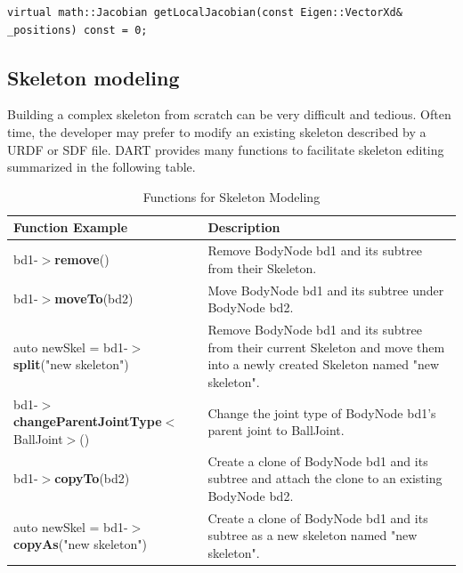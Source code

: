 \begin{lstlisting}[caption=Joint.h]
virtual math::Jacobian getLocalJacobian(const Eigen::VectorXd&
_positions) const = 0;
\end{lstlisting}






\subsection{Skeleton modeling}
Building a complex skeleton from scratch can be very
difficult and tedious. Often time, the developer may prefer to modify an
existing skeleton described by a URDF or SDF file. DART provides many
functions to facilitate skeleton editing summarized in the following
table.

\begin{table}[h]
\centering
\caption{Functions for Skeleton Modeling}
\begin{tabular}{|L{3.3in}|L{2.7in}|}
  \hline
  \textbf{Function Example} & \textbf{Description} \\
  \hline
  bd1-$>$\textbf{remove}() & Remove BodyNode bd1 and its subtree from their Skeleton.  \\
  \hline
   bd1-$>$\textbf{moveTo}(bd2) & Move BodyNode bd1 and its subtree under BodyNode bd2.  \\
  \hline
 auto newSkel = bd1-$>$\textbf{split}("new skeleton") & Remove BodyNode bd1 and its subtree from their current Skeleton and move them into a newly created Skeleton named "new skeleton".  \\
  \hline
 bd1-$>$\textbf{changeParentJointType}$<$BallJoint$>$() & Change the joint type of BodyNode bd1's parent joint to BallJoint.  \\
  \hline
bd1-$>$\textbf{copyTo}(bd2) & Create a clone of BodyNode bd1 and its subtree
                   and attach the clone to an existing BodyNode bd2. \\
  \hline
 auto newSkel = bd1-$>$\textbf{copyAs}("new skeleton") & Create a
                                                         clone of
                                                         BodyNode bd1
                                                         and its
                                                         subtree as a new skeleton named "new skeleton".  \\
  \hline
\end{tabular}
\label{tab:skeletonEdit}
\end{table}

